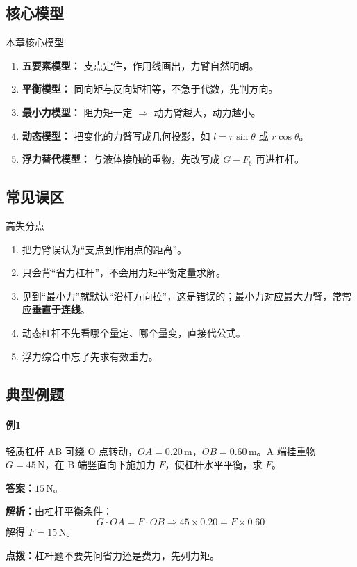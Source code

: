\documentclass[12pt,a4paper]{ctexart}
\newcommand{\Ans}[1]{\par\noindent\textbf{答案：}#1\par}
\newcommand{\Sol}[1]{\par\noindent\textbf{解析：}#1\par}
\newcommand{\Tip}[1]{\par\noindent\textbf{点拨：}#1\par}
\begin{document}
\subsection{核心模型}
\begin{modelbox}{本章核心模型}
\begin{enumerate}[label=\arabic*.]
\item \textbf{五要素模型：} 支点定住，作用线画出，力臂自然明朗。
\item \textbf{平衡模型：} 同向矩与反向矩相等，不急于代数，先判方向。
\item \textbf{最小力模型：} 阻力矩一定 $\Rightarrow$ 动力臂越大，动力越小。
\item \textbf{动态模型：} 把变化的力臂写成几何投影，如 $l=r\sin\theta$ 或 $r\cos\theta$。
\item \textbf{浮力替代模型：} 与液体接触的重物，先改写成 $G-F_b$ 再进杠杆。
\end{enumerate}
\end{modelbox}

\subsection{常见误区}
\begin{pitfallbox}{高失分点}
\begin{enumerate}[label=\arabic*.]
\item 把力臂误认为“支点到作用点的距离”。
\item 只会背“省力杠杆”，不会用力矩平衡定量求解。
\item 见到“最小力”就默认“沿杆方向拉”，这是错误的；最小力对应最大力臂，常常应\textbf{垂直于连线}。
\item 动态杠杆不先看哪个量定、哪个量变，直接代公式。
\item 浮力综合中忘了先求有效重力。
\end{enumerate}
\end{pitfallbox}

\subsection{典型例题}
\paragraph{例1}
轻质杠杆 AB 可绕 O 点转动，$OA=0.20\,\mathrm{m}$，$OB=0.60\,\mathrm{m}$。A 端挂重物
$G=45\,\mathrm{N}$，在 B 端竖直向下施加力 $F$，使杠杆水平平衡，求 $F$。

\Ans{$15\,\mathrm{N}$。}
\Sol{由杠杆平衡条件：
\[
G\cdot OA = F\cdot OB
\Rightarrow 45\times 0.20 = F\times 0.60
\]
解得 $F=15\,\mathrm{N}$。}
\Tip{杠杆题不要先问省力还是费力，先列力矩。}
\end{document}
